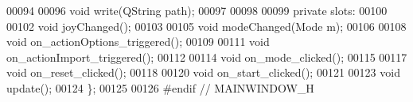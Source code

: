 \begin{DoxyCode}
00094     
00096     \textcolor{keywordtype}{void} write(QString path);
00097 
00098         
00099 \textcolor{keyword}{private} slots:
00100     
00102     \textcolor{keywordtype}{void} joyChanged();
00103     
00105     \textcolor{keywordtype}{void} modeChanged(Mode m);
00106     
00108     \textcolor{keywordtype}{void} on\_actionOptions\_triggered();
00109     
00111     \textcolor{keywordtype}{void} on\_actionImport\_triggered();
00112     
00114     \textcolor{keywordtype}{void} on\_mode\_clicked();
00115     
00117     \textcolor{keywordtype}{void} on\_reset\_clicked();
00118     
00120     \textcolor{keywordtype}{void} on\_start\_clicked();
00121     
00123     \textcolor{keywordtype}{void} update();
00124 \};
00125 
00126 \textcolor{preprocessor}{#endif // MAINWINDOW\_H}
\end{DoxyCode}
